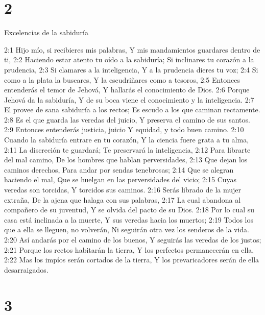 \chapter{2}

Excelencias de la sabiduría  

2:1 Hijo mío, si recibieres mis palabras,  
Y mis mandamientos guardares dentro de ti,  
2:2 Haciendo estar atento tu oído a la sabiduría;  
Si inclinares tu corazón a la prudencia,  
2:3 Si clamares a la inteligencia,  
Y a la prudencia dieres tu voz;  
2:4 Si como a la plata la buscares,  
Y la escudriñares como a tesoros,  
2:5 Entonces entenderás el temor de Jehová,  
Y hallarás el conocimiento de Dios.  
2:6 Porque Jehová da la sabiduría,  
Y de su boca viene el conocimiento y la inteligencia.  
2:7 El provee de sana sabiduría a los rectos;  
Es escudo a los que caminan rectamente.  
2:8 Es el que guarda las veredas del juicio,  
Y preserva el camino de sus santos.  
2:9 Entonces entenderás justicia, juicio  
Y equidad, y todo buen camino.  
2:10 Cuando la sabiduría entrare en tu corazón,  
Y la ciencia fuere grata a tu alma,  
2:11 La discreción te guardará;  
Te preservará la inteligencia,  
2:12 Para librarte del mal camino,  
De los hombres que hablan perversidades,  
2:13 Que dejan los caminos derechos,  
Para andar por sendas tenebrosas;  
2:14 Que se alegran haciendo el mal,  
Que se huelgan en las perversidades del vicio;  
2:15 Cuyas veredas son torcidas,  
Y torcidos sus caminos.  
2:16 Serás librado de la mujer extraña, 
De la ajena que halaga con sus palabras,  
2:17 La cual abandona al compañero de su juventud,  
Y se olvida del pacto de su Dios.  
2:18 Por lo cual su casa está inclinada a la muerte,  
Y sus veredas hacia los muertos;  
2:19 Todos los que a ella se lleguen, no volverán,  
Ni seguirán otra vez los senderos de la vida.  
2:20 Así andarás por el camino de los buenos,  
Y seguirás las veredas de los justos;  
2:21 Porque los rectos habitarán la tierra,  
Y los perfectos permanecerán en ella,  
2:22 Mas los impíos serán cortados de la tierra,  
Y los prevaricadores serán de ella desarraigados.  

\chapter{3}


